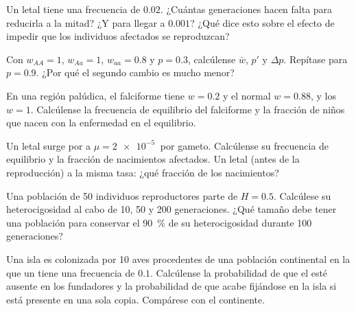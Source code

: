 \begin{exercise}[$\star\star$]\label{exo:b2:population-genetics:5}
Un   letal tiene una frecuencia de $0.02$. ¿Cuántas
generaciones hacen falta para reducirla a la mitad? ¿Y para llegar a
$0.001$? ¿Qué dice esto sobre el efecto de impedir que los individuos
afectados se reproduzcan?
\end{exercise}

\begin{exercise}[$\star\star$]\label{exo:b2:population-genetics:6}
Con $w_{AA} = 1$, $w_{Aa} = 1$, $w_{aa} = 0.8$ y $p = 0.3$, calcúlense
$\bar w$, $p'$ y $\Delta p$. Repítase para $p = 0.9$. ¿Por qué el
segundo cambio es mucho menor?
\end{exercise}

\begin{exercise}[$\star\star$]\label{exo:b2:population-genetics:7}
En una región palúdica, el  falciforme tiene $w = 0.2$ y el
 normal
$w = 0.88$, y los  $w = 1$. Calcúlense la frecuencia de
equilibrio del  falciforme y la fracción de niños que nacen con la
enfermedad en el equilibrio.
\end{exercise}

\begin{exercise}[$\star\star$]\label{exo:b2:population-genetics:8}
Un letal  surge por  a $\mu = \qty{2e-5}{}$ por gameto.
Calcúlense su frecuencia de equilibrio y la fracción de nacimientos
afectados. Un letal  (antes de la reproducción) a la misma tasa:
¿qué fracción de los nacimientos?
\end{exercise}

\begin{exercise}[$\star\star$]\label{exo:b2:population-genetics:9}
Una población de 50 individuos reproductores parte de $H = 0.5$.
Calcúlese su heterocigosidad al cabo de 10, 50 y 200 generaciones. ¿Qué
tamaño debe tener una población para conservar el \qty{90}{\%} de su
heterocigosidad durante 100 generaciones?
\end{exercise}

\begin{exercise}[$\star\star\star$]\label{exo:b2:population-genetics:10}
Una isla es colonizada por 10 aves procedentes de una población
continental en la que un  tiene una frecuencia de $0.1$. Calcúlense
la probabilidad de que el  esté ausente en los fundadores y la
probabilidad de que acabe fijándose en la isla si está presente en una
sola copia. Compárese con el continente.
\end{exercise}

